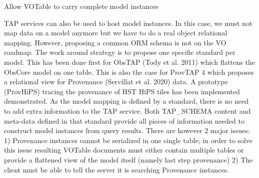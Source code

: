 Allow VOTable to carry complete model instances

TAP services can also be used to host model instances. In this case, we must not
map data on a model anymore but we have to do a real object relational mapping.
However, proposing a common ORM schema is not on the VO roadmap. The work
around strategy is to propose one specific standard per model. This has been done first
for ObsTAP (Tody et al. 2011) which flattens the ObsCore model on one table. This is
also the case for ProvTAP 4 which proposes a relational view for Provenance (Servillat
et al. 2020) data. A prototype (ProvHiPS) tracing the provenance of HST HiPS tiles
has been implemented demonstrated. As the model mapping is defined by a standard,
there is no need to add extra information to the TAP service. Both TAP\_SCHEMA
content and meta-data defined in that standard provide all pieces of information needed
to construct model instances from query results. There are however 2 major issues: 1)
Provenance instances cannot be serialized in one single table; in order to solve this issue
resulting VOTable documents must either contain multiple tables or provide a flattened
view of the model itself (namely last step provenance) 2) The client must be able to tell
the server it is searching Provenance instances.

